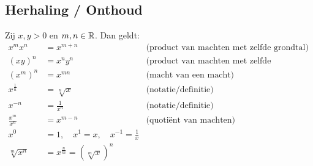 \documentclass{ximera}
\begin{document}
\subsection{Herhaling / Onthoud }\label{machtenrekenregels}

\begin{proposition}
Zij $x,y>0$ en $m,n\in\mathbb{R}$. Dan geldt:
\begin{align*}
	x^{m}x^{n}          &= x^{m+n}     & \text{(product van machten met zelfde grondtal)}\\
	(xy)^n              &= x^ny^n      & \text{(product van machten met zelfde exponent)}\\
	\left(x^{m}\right)^{n}&= x^{mn}    & \text{(macht van een macht)}\\	
	x^{\frac1n} &= \sqrt[n] x          & \text{(notatie/definitie)}\\
	x^{-n}          &= \frac{1}{x^n}  & \text{(notatie/definitie)}\\
	\frac{x^{m}}{x^{n}} &= x^{m-n}      & \text{(quotiënt van machten)} \\
	x^0&=1, \quad x^1=x, \quad x^{-1}=\frac1x \\
	\sqrt[m]{x^n} & = x^{\frac{n}{m}} = (\sqrt[m]{x})^n
\end{align*}
\end{proposition}
\end{document}

